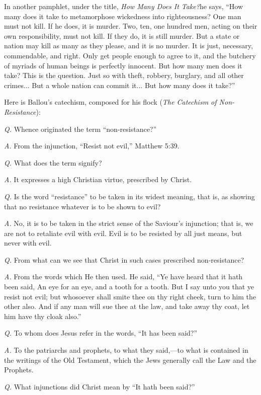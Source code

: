 \documentclass{book}
\begin{document}
In another pamphlet, under the title, \emph{How Many Does It Take?}\footnotemark[2] he says, “How many does it take to metamorphose wickedness into righteousness? One man must not kill. If he does, it is murder. Two, ten, one hundred men, acting on their own responsibility, must not kill. If they do, it is still murder. But a state or nation may kill as many as they please, and it is no murder. It is just, necessary, commendable, and right. Only get people enough to agree to it, and the butchery of myriads of human beings is perfectly innocent. But how many men does it take? This is the question. Just so with theft, robbery, burglary, and all other crimes... But a whole nation can commit it... But how many does it take?”\footnotemark[3]

Here is Ballou’s catechism, composed for his flock (\emph{The Catechism of Non-Resistance}\footnotemark[2]):

\emph{Q.} Whence originated the term “non-resistance?”

\emph{A.} From the injunction, “Resist not evil,” Matthew 5:39.

\emph{Q.} What does the term signify?

\emph{A.} It expresses a high Christian virtue, prescribed by Christ.

\emph{Q.} Is the word “resistance” to be taken in its widest meaning, that is, as showing that no resistance whatever is to be shown to evil?

\emph{A.} No, it is to be taken in the strict sense of the Saviour’s injunction; that is, we are not to retaliate evil with evil. Evil is to be resisted by all just means, but never with evil.

\emph{Q.} From what can we see that Christ in such cases prescribed non-resistance?

\emph{A.} From the words which He then used. He said, “Ye have heard that it hath been said, An eye for an eye, and a tooth for a tooth. But I say unto you that ye resist not evil; but whosoever shall smite thee on thy right cheek, turn to him the other also. And if any man will sue thee at the law, and take away thy coat, let him have thy cloak also.”

\emph{Q.} To whom does Jesus refer in the words, “It has been said?”

\emph{A.} To the patriarchs and prophets, to what they said,—to what is contained in the writings of the Old Testament, which the Jews generally call the Law and the Prophets.

\emph{Q.} What injunctions did Christ mean by “It hath been said?”
\end{document}

